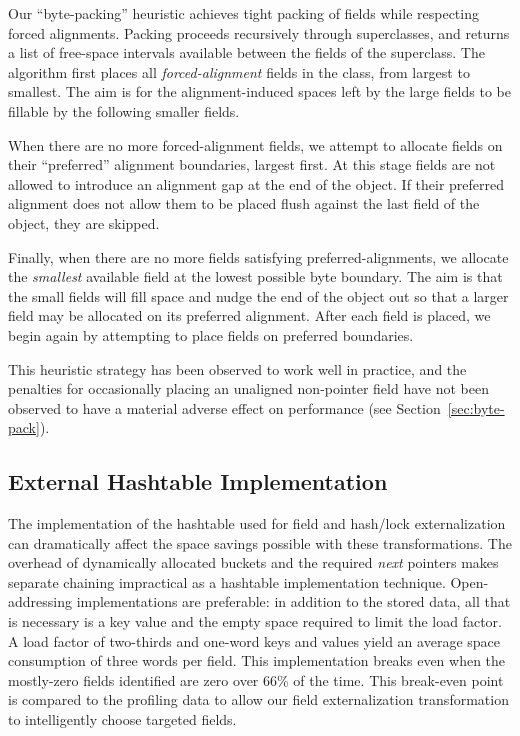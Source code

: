 \documentclass{sig-alt-full}
\begin{document}
Our ``byte-packing'' heuristic achieves
tight packing of fields while respecting forced alignments.  Packing
proceeds recursively through superclasses, and returns a list of
free-space intervals available between the fields of the superclass.
The algorithm first places all {\it forced-alignment} fields in
the class, from largest to smallest.  The aim is for the
alignment-induced spaces left by the large fields to be fillable by
the following smaller fields.

When there are no more forced-alignment fields, we attempt to allocate
fields on their ``preferred'' alignment boundaries, largest first.
At this stage fields are not allowed to introduce an alignment gap at
the end of the object.  If their preferred alignment does not allow
them to be placed flush
against the last field of the object, they are skipped.

Finally, when there are no more fields satisfying
preferred-alignments, we
allocate the {\it smallest} available field at the lowest possible
byte boundary.
The aim is that the small fields will fill space and nudge
the end of the object out so that a larger field may be allocated on
its preferred alignment.  After each field is placed, we begin again
by attempting to place fields on preferred boundaries.

This heuristic strategy has been observed to work well in practice,
and the penalties for occasionally placing an unaligned non-pointer
field have not
been observed to have a material adverse effect on performance (see
Section~\ref{sec:byte-pack}). 



\subsection{External Hashtable Implementation}
\label{sec:extern-impl}

The implementation of the hashtable used for field and hash/lock
externalization can dramatically affect the space savings possible
with these transformations.  The overhead of
dynamically allocated buckets and the required {\it next} pointers
makes separate chaining impractical as a hashtable implementation technique.
Open-addressing
implementations are preferable: in addition to the stored data,
all that is necessary is a key value and the empty space required to
limit the load factor.  A load factor of two-thirds and one-word keys
and values yield an average space consumption of three words per
field.  This implementation breaks even when the mostly-zero fields
identified are zero over 66\% of the time.  This break-even point is
compared to the profiling data to allow our field externalization
transformation to intelligently choose targeted fields.
\end{document}
